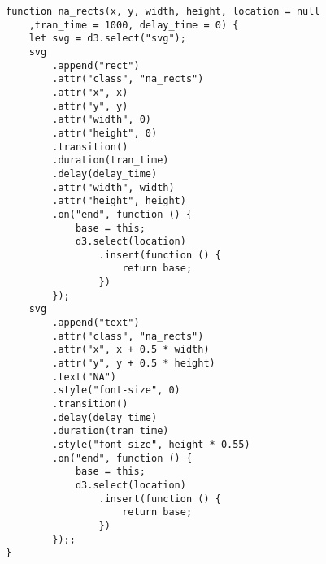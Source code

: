 \begin{lstlisting}
function na_rects(x, y, width, height, location = null
    ,tran_time = 1000, delay_time = 0) {
    let svg = d3.select("svg");
    svg
        .append("rect")
        .attr("class", "na_rects")
        .attr("x", x)
        .attr("y", y)
        .attr("width", 0)
        .attr("height", 0)
        .transition()
        .duration(tran_time)
        .delay(delay_time)
        .attr("width", width)
        .attr("height", height)
        .on("end", function () {
            base = this;
            d3.select(location)
                .insert(function () {
                    return base;
                })
        });
    svg
        .append("text")
        .attr("class", "na_rects")
        .attr("x", x + 0.5 * width)
        .attr("y", y + 0.5 * height)
        .text("NA")
        .style("font-size", 0)
        .transition()
        .delay(delay_time)
        .duration(tran_time)
        .style("font-size", height * 0.55)
        .on("end", function () {
            base = this;
            d3.select(location)
                .insert(function () {
                    return base;
                })
        });;
}


\end{lstlisting}
